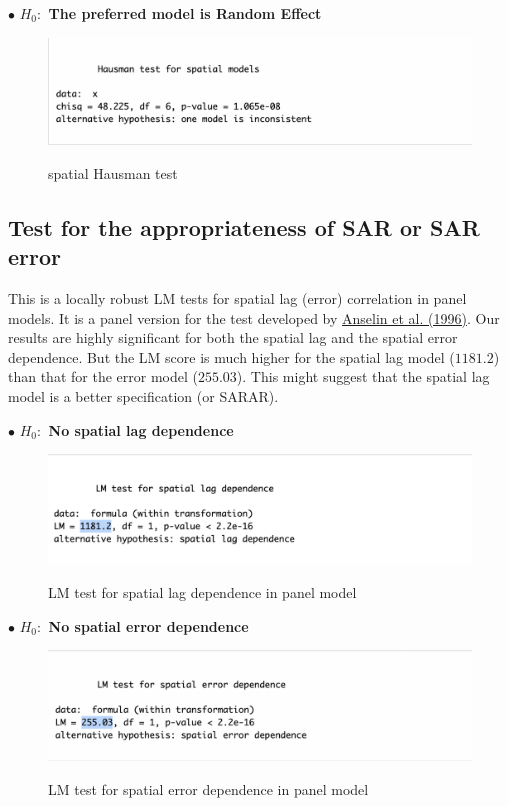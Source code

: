 \documentclass[11pt,a4paper]{amsart}
\theoremstyle{plain}
\theoremstyle{definition}
\begin{document}
$\bullet$ \textbf{ $H_{0}:$ The preferred model is Random Effect}
\begin{figure}[hbt]
	{\centering \includegraphics[scale=0.68]{hausman}}
	\caption{spatial Hausman test}\label{F:hausman}
\end{figure}

\subsection{Test for  the appropriateness of SAR or SAR error}\par\hfill

This is a locally robust LM tests for spatial lag (error) correlation in panel models. It is a panel version for the test developed by \href{https://www.sciencedirect.com/science/article/pii/0166046295021116}{Anselin et al. (1996)}. Our results are highly significant for both the spatial lag and the spatial error dependence. But the LM score is much higher for the spatial lag model ($1181.2$) than that for the error model ($255.03$). This might suggest that the spatial lag model is a better specification (or SARAR).

$\bullet$ \textbf{ $H_{0}:$ No spatial lag dependence}
\begin{figure}[hbt]
	{\centering \includegraphics[scale=0.68]{lmlag}}
	\caption{LM test for spatial lag dependence in panel model}\label{F:lmlag}
\end{figure}

$\bullet$ \textbf{ $H_{0}:$ No spatial error dependence}
\begin{figure}[hbt]
	{\centering \includegraphics[scale=0.68]{lmerror}}
	\caption{LM test for spatial error dependence in panel model}\label{F:lmerror}
\end{figure}
\end{document}
